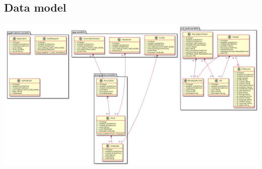 \documentclass[11pt]{beamer}
\begin{document}
\subsection{Data model}
\begin{frame}
	\begin{center}
		\includegraphics[width=\textwidth]{../UML/tima.png}
	\end{center}
\end{frame}
\end{document}
